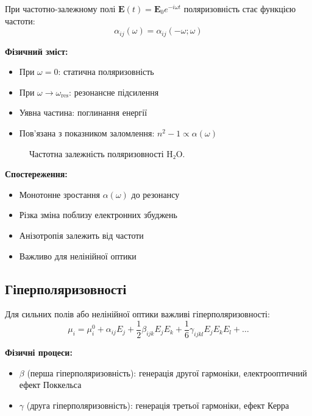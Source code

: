 При частотно-залежному полі $\mathbf{E}(t) = \mathbf{E}_0 e^{-i\omega t}$
поляризовність стає функцією частоти:
\[
\alpha_{ij}(\omega) = \alpha_{ij}(-\omega; \omega)
\]

\textbf{Фізичний зміст:}
\begin{itemize}
    \item При $\omega = 0$: статична поляризовність
    \item При $\omega \to \omega_{\text{res}}$: резонансне підсилення
    \item Уявна частина: поглинання енергії
    \item Пов'язана з показником заломлення: $n^2 - 1 \propto \alpha(\omega)$
\end{itemize}


\begin{figure}[h!]\centering
\caption{Частотна залежність поляризовності H₂O.}
\label{pic:h2o_dynamic_pol}
\end{figure}

\textbf{Спостереження:}
\begin{itemize}
    \item Монотонне зростання $\alpha(\omega)$ до резонансу
    \item Різка зміна поблизу електронних збуджень
    \item Анізотропія залежить від частоти
    \item Важливо для нелінійної оптики
\end{itemize}

\subsection{Гіперполяризовності}

Для сильних полів або нелінійної оптики важливі гіперполяризовності:
\[
\mu_i = \mu_i^0 + \alpha_{ij} E_j + \frac{1}{2}\beta_{ijk} E_j E_k +
\frac{1}{6}\gamma_{ijkl} E_j E_k E_l + \ldots
\]

\textbf{Фізичні процеси:}
\begin{itemize}
    \item $\beta$ (перша гіперполяризовність): генерація другої гармоніки,
          електрооптичний ефект Поккельса
    \item $\gamma$ (друга гіперполяризовність): генерація третьої гармоніки,
          ефект Керра
\end{itemize}

